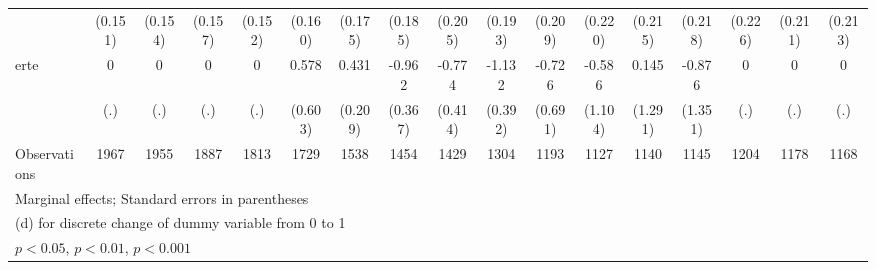 {\begin{tabular}{l*{16}{c}}
                    &     (0.151)         &     (0.154)         &     (0.157)         &     (0.152)         &     (0.160)         &     (0.175)         &     (0.185)         &     (0.205)         &     (0.193)         &     (0.209)         &     (0.220)         &     (0.215)         &     (0.218)         &     (0.226)         &     (0.211)         &     (0.213)         \\
[1em]
erte                &           0         &           0         &           0         &           0         &       0.578         &       0.431\sym{*}  &      -0.962\sym{**} &      -0.774         &      -1.132\sym{**} &      -0.726         &      -0.586         &       0.145         &      -0.876         &           0         &           0         &           0         \\
                    &         (.)         &         (.)         &         (.)         &         (.)         &     (0.603)         &     (0.209)         &     (0.367)         &     (0.414)         &     (0.392)         &     (0.691)         &     (1.104)         &     (1.291)         &     (1.351)         &         (.)         &         (.)         &         (.)         \\
\hline
Observations        &        1967         &        1955         &        1887         &        1813         &        1729         &        1538         &        1454         &        1429         &        1304         &        1193         &        1127         &        1140         &        1145         &        1204         &        1178         &        1168         \\
\hline\hline
\multicolumn{17}{l}{\footnotesize Marginal effects; Standard errors in parentheses}\\
\multicolumn{17}{l}{\footnotesize  (d) for discrete change of dummy variable from 0 to 1}\\
\multicolumn{17}{l}{\footnotesize \sym{*} \(p<0.05\), \sym{**} \(p<0.01\), \sym{***} \(p<0.001\)}\\
\end{tabular}
}
